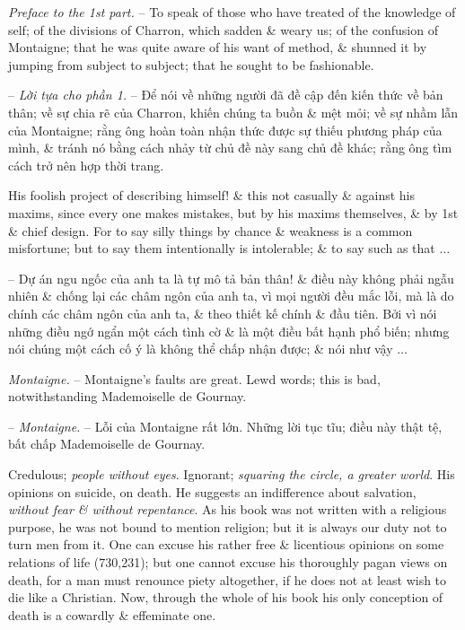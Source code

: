 \documentclass{article}
\begin{document}
\begin{enumerate}
\begin{itemize}
		 {\it Preface to the 1st part.} -- To speak of those who have treated of the knowledge of self; of the divisions of Charron, which sadden \& weary us; of the confusion of Montaigne; that he was quite aware of his want of method, \& shunned it by jumping from subject to subject; that he sought to be fashionable.
		
		-- {\it Lời tựa cho phần 1.} -- Để nói về những người đã đề cập đến kiến thức về bản thân; về sự chia rẽ của Charron, khiến chúng ta buồn \& mệt mỏi; về sự nhầm lẫn của Montaigne; rằng ông hoàn toàn nhận thức được sự thiếu phương pháp của mình, \& tránh nó bằng cách nhảy từ chủ đề này sang chủ đề khác; rằng ông tìm cách trở nên hợp thời trang.
		
		His foolish project of describing himself! \& this not casually \& against his maxims, since every one makes mistakes, but by his maxims themselves, \& by 1st \& chief design. For to say silly things by chance \& weakness is a common misfortune; but to say them intentionally is intolerable; \& to say such as that $\ldots$
		
		-- Dự án ngu ngốc của anh ta là tự mô tả bản thân! \& điều này không phải ngẫu nhiên \& chống lại các châm ngôn của anh ta, vì mọi người đều mắc lỗi, mà là do chính các châm ngôn của anh ta, \& theo thiết kế chính \& đầu tiên. Bởi vì nói những điều ngớ ngẩn một cách tình cờ \& là một điều bất hạnh phổ biến; nhưng nói chúng một cách cố ý là không thể chấp nhận được; \& nói như vậy $\ldots$
		
		 {\it Montaigne.} -- {\sc Montaigne}'s faults are great. Lewd words; this is bad, notwithstanding {\sc Mademoiselle de Gournay}.
		
		-- {\it Montaigne.} -- Lỗi của {\sc Montaigne} rất lớn. Những lời tục tĩu; điều này thật tệ, bất chấp {\sc Mademoiselle de Gournay}.
		
		Credulous; {\it people without eyes}. Ignorant; {\it squaring the circle, a greater world}. His opinions on suicide, on death. He suggests an indifference about salvation, {\it without fear \& without repentance}. As his book was not written with a religious purpose, he was not bound to mention religion; but it is always our duty not to turn men from it.  One can excuse his rather free \& licentious opinions on some relations of life (730,231); but one cannot excuse his thoroughly pagan views on death, for a man must renounce piety altogether, if he does not at least wish to die like a Christian. Now, through the whole of his book his only conception of death is a cowardly \& effeminate one.
		

\end{itemize}
\end{enumerate}
\end{document}

